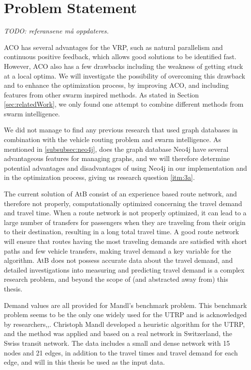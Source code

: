 \section{Problem Statement}
\label{sec:problemStatement}

\emph{\color{blue} TODO: referansene må oppdateres.}

ACO has several advantages for the VRP, such as natural parallelism and continuous positive feedback, which allows good solutions to be identified fast. However, ACO also has a few drawbacks including the weakness of getting stuck at a local optima. We will investigate the possibility of overcoming this drawback and to enhance the optimization process, by improving ACO, and including features from other swarm inspired methods. As stated in Section \vref{sec:relatedWork}, we only found one attempt to combine different methods from swarm intelligence.%

We did not manage to find any previous research that used graph databases in combination with the vehicle routing problem and swarm intelligence. As mentioned in \vref{subsubsec:neo4j}, does the graph database Neo4j \citep{website:neo4j} have several advantageous features for managing graphs, and we will therefore determine potential advantages and disadvantages of using Neo4j in our implementation and in the optimization process, giving us research question \vref{itm:3a}.

The current solution of AtB consist of an experience based route network, and therefore not properly, computationally optimized concerning the travel demand and travel time. When a route network is not properly optimized, it can lead to a large number of transfers for passengers when they are traveling from their origin to their destination, resulting in a long total travel time. A good route network will ensure that routes having the most traveling demands are satisfied with short paths and few vehicle transfers, making travel demand a key variable for the algorithm. AtB\citep{website:atb} does not possess accurate data about the travel demand, and detailed investigations into measuring and predicting travel demand is a complex research problem, and beyond the scope of (and abstracted away\citep{cohen88} from) this thesis. 

Demand values are all provided for Mandl's benchmark problem\citep{mandl79}. This benchmark problem seems to be the only one widely used for the UTRP and is acknowledged by researchers\citep{fan09},\citep{kechagiopoulos14},\citep{nikolic14}. Christoph Mandl\citep{mandl79} developed a heuristic algorithm for the UTRP, and the method was applied and based on a real network in Switzerland, the Swiss transit network\citep{mandl80}. The data includes a small and dense network with 15 nodes and 21 edges, in addition to the travel times and travel demand for each edge, and will in this thesis be used as the input data. 

